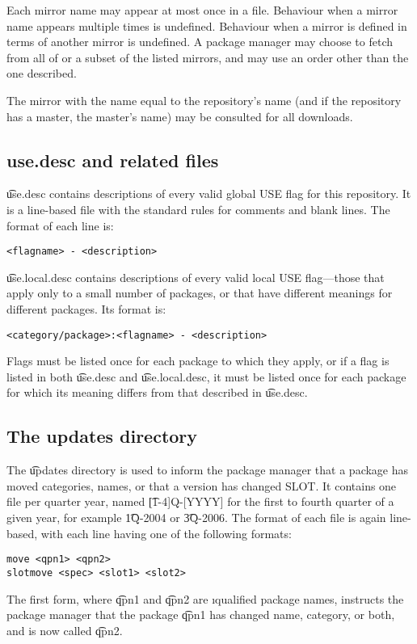 Each mirror name may appear at most once in a file. Behaviour when a mirror name appears multiple
times is undefined. Behaviour when a mirror is defined in terms of another mirror is undefined. A
package manager may choose to fetch from all of or a subset of the listed mirrors, and may use an
order other than the one described.

The mirror with the name equal to the repository's name (and if the repository has a master,
the master's name) may be consulted for all downloads.

\subsection{use.desc and related files}
\label{sec:use.desc}
\t{use.desc} contains descriptions of every valid global USE flag for this repository. It is a
line-based file with the standard rules for comments and blank lines. The format of each line is:
\begin{verbatim}
<flagname> - <description>
\end{verbatim}

\t{use.local.desc} contains descriptions of every valid local USE flag---those that apply only to a
small number of packages, or that have different meanings for different packages. Its format is:
\begin{verbatim}
<category/package>:<flagname> - <description>
\end{verbatim}
Flags must be listed once for each package to which they apply, or if a flag is listed in both
\t{use.desc} and \t{use.local.desc}, it must be listed once for each package for which its meaning
differs from that described in \t{use.desc}.

\subsection{The updates directory}
\label{sec:updates-dir}
The \t{updates} directory is used to inform the package manager that a package has moved categories,
names, or that a version has changed SLOT\@. It contains one file per quarter year, named
\t{[1-4]Q-[YYYY]} for the first to fourth quarter of a given year, for example \t{1Q-2004} or
\t{3Q-2006}. The format of each file is again line-based, with each line having one of the following
formats:
\begin{verbatim}
move <qpn1> <qpn2>
slotmove <spec> <slot1> <slot2>
\end{verbatim}
The first form, where \t{qpn1} and \t{qpn2} are \i{qualified package names}, instructs the package
manager that the package \t{qpn1} has changed name, category, or both, and is now called \t{qpn2}.

